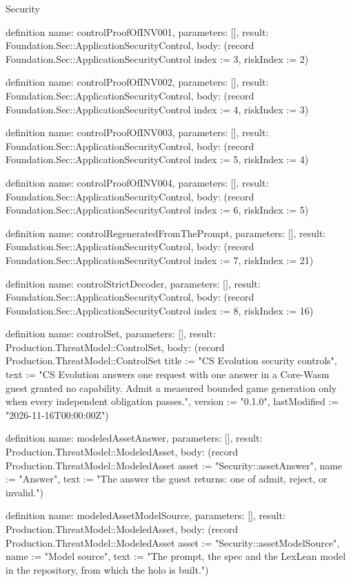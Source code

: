 \begin{lexlean}{Security}
\begin{semanticmodule}
definition{
  name: controlProofOfINV001,
  parameters: [],
  result: Foundation.Sec::ApplicationSecurityControl,
  body: (record Foundation.Sec::ApplicationSecurityControl {index := 3, riskIndex := 2})
}

definition{
  name: controlProofOfINV002,
  parameters: [],
  result: Foundation.Sec::ApplicationSecurityControl,
  body: (record Foundation.Sec::ApplicationSecurityControl {index := 4, riskIndex := 3})
}

definition{
  name: controlProofOfINV003,
  parameters: [],
  result: Foundation.Sec::ApplicationSecurityControl,
  body: (record Foundation.Sec::ApplicationSecurityControl {index := 5, riskIndex := 4})
}

definition{
  name: controlProofOfINV004,
  parameters: [],
  result: Foundation.Sec::ApplicationSecurityControl,
  body: (record Foundation.Sec::ApplicationSecurityControl {index := 6, riskIndex := 5})
}

definition{
  name: controlRegeneratedFromThePrompt,
  parameters: [],
  result: Foundation.Sec::ApplicationSecurityControl,
  body: (record Foundation.Sec::ApplicationSecurityControl {index := 7, riskIndex := 21})
}

definition{
  name: controlStrictDecoder,
  parameters: [],
  result: Foundation.Sec::ApplicationSecurityControl,
  body: (record Foundation.Sec::ApplicationSecurityControl {index := 8, riskIndex := 16})
}

definition{
  name: controlSet,
  parameters: [],
  result: Production.ThreatModel::ControlSet,
  body: (record Production.ThreatModel::ControlSet {title := "CS Evolution security controls", text := "CS Evolution answers one request with one answer in a Core-Wasm guest granted no capability. Admit a measured bounded game generation only when every independent obligation passes.", version := "0.1.0", lastModified := "2026-11-16T00:00:00Z"})
}

definition{
  name: modeledAssetAnswer,
  parameters: [],
  result: Production.ThreatModel::ModeledAsset,
  body: (record Production.ThreatModel::ModeledAsset {asset := "Security::assetAnswer", name := "Answer", text := "The answer the guest returns: one of admit, reject, or invalid."})
}

definition{
  name: modeledAssetModelSource,
  parameters: [],
  result: Production.ThreatModel::ModeledAsset,
  body: (record Production.ThreatModel::ModeledAsset {asset := "Security::assetModelSource", name := "Model source", text := "The prompt, the spec and the LexLean model in the repository, from which the holo is built."})
}


\end{semanticmodule}
\end{lexlean}
